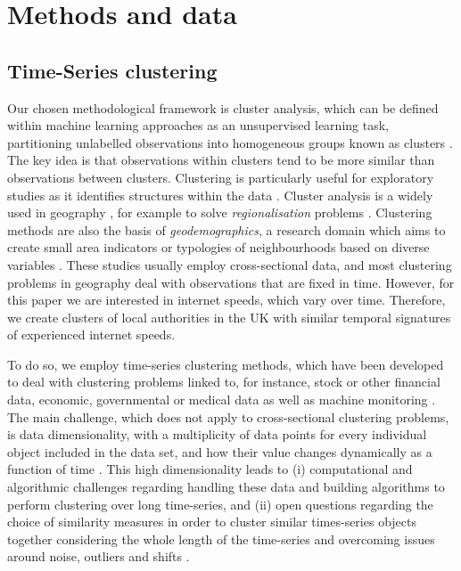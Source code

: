 \documentclass[]{interact}
\theoremstyle{plain}%
\theoremstyle{definition}
\theoremstyle{remark}
\begin{document}
\hypertarget{sec:3}{%
\section{Methods and data}\label{sec:3}}

\hypertarget{sec:3.1}{%
\subsection{Time-Series clustering}\label{sec:3.1}}

Our chosen methodological framework is cluster analysis, which can be
defined within machine learning approaches as an unsupervised learning
task, partitioning unlabelled observations into homogeneous groups known
as clusters \citep{montero2014tsclust}. The key idea is that
observations within clusters tend to be more similar than observations
between clusters. Clustering is particularly useful for exploratory
studies as it identifies structures within the data
\citep{aghabozorgi2015time}. Cluster analysis is a widely used in
geography \citep{gordon1977classification, everitt1974cluster}, for
example to solve \emph{regionalisation} problems
\citep{niesterowicz2016}. Clustering methods are also the basis of
\emph{geodemographics}, a research domain which aims to create small
area indicators or typologies of neighbourhoods based on diverse
variables \citep{SINGLETON2009289, harris2005geodemographics}. These
studies usually employ cross-sectional data, and most clustering
problems in geography deal with observations that are fixed in time.
However, for this paper we are interested in internet speeds, which vary
over time. Therefore, we create clusters of local authorities in the UK
with similar temporal signatures of experienced internet speeds.

To do so, we employ time-series clustering methods, which have been
developed to deal with clustering problems linked to, for instance,
stock or other financial data, economic, governmental or medical data as
well as machine monitoring
\citep{aggarwal2013time, aggarwal2001surprising, hyndman2015large, WARRENLIAO20051857}.
The main challenge, which does not apply to cross-sectional clustering
problems, is data dimensionality, with a multiplicity of data points for
every individual object included in the data set, and how their value
changes dynamically as a function of time \citep{aghabozorgi2015time}.
This high dimensionality leads to (i) computational and algorithmic
challenges regarding handling these data and building algorithms to
perform clustering over long time-series, and (ii) open questions
regarding the choice of similarity measures in order to cluster similar
times-series objects together considering the whole length of the
time-series and overcoming issues around noise, outliers and shifts
\citep{lin2004iterative, aghabozorgi2015time}.
\end{document}

